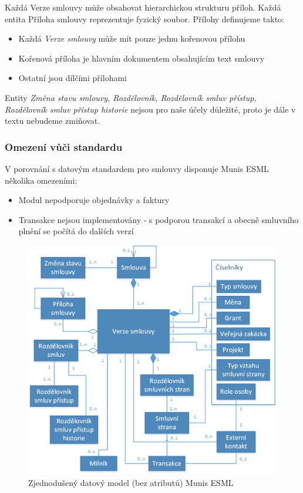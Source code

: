 Každá Verze smlouvy může obsahovat hierarchickou strukturu příloh. Každá entita Příloha smlouvy reprezentuje fyzický soubor. Přílohy definujeme takto:

\begin{itemize}
\item Každá \textit{Verze smlouvy} může mít pouze jednu kořenovou přílohu
\item Kořenová příloha je hlavním dokumentem obsahujícím text smlouvy
\item Ostatní jsou dílčími přílohami
\end{itemize}

Entity \textit{Změna stavu smlouvy, Rozdělovník, Rozdělovník smluv přístup, Rozdělovník smluv přístup historie} nejsou pro naše účely důležité, proto je dále v textu nebudeme zmiňovat.

\subsubsection{Omezení vůči standardu}

V porovnání s datovým standardem pro smlouvy disponuje Munis ESML několika omezeními:

\begin{itemize}
\item Modul nepodporuje objednávky a faktury
\item Transakce nejsou implementovány - s podporou transakcí a obecně smluvního plnění se počítá do dalších verzí 
\end{itemize}

\begin{figure}[H]
\centerline{\includegraphics[width=\textwidth]{img/munisDatamodel.eps}}
\caption{ Zjednodušený datový model (bez atributů) Munis ESML}
\label{obr:munisDatamodel}
\end{figure}


